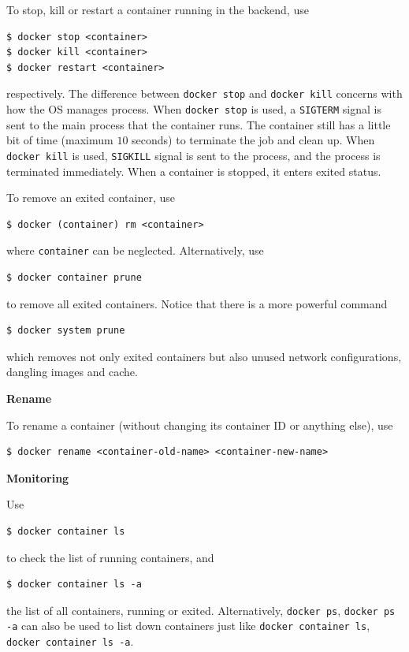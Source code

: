 To stop, kill or restart a container running in the backend, use
\begin{lstlisting}
$ docker stop <container>
$ docker kill <container>
$ docker restart <container>
\end{lstlisting}
respectively. The difference between \verb|docker stop| and \verb|docker kill| concerns with how the OS manages process. When \verb|docker stop| is used, a  \verb|SIGTERM| signal is sent to the main process that the container runs. The container still has a little bit of time (maximum $10$ seconds) to terminate the job and clean up. When \verb|docker kill| is used, \verb|SIGKILL| signal is sent to the process, and the process is terminated immediately. When a container is stopped, it enters exited status.

To remove an exited container, use
\begin{lstlisting}
$ docker (container) rm <container>
\end{lstlisting}
where \verb|container| can be neglected. Alternatively, use
\begin{lstlisting}
$ docker container prune
\end{lstlisting}
to remove all exited containers. Notice that there is a more powerful command
\begin{lstlisting}
$ docker system prune
\end{lstlisting}
which removes not only exited containers but also unused network configurations, dangling images and cache.

\vspace{0.1in}
\noindent \textbf{Rename}
\vspace{0.1in}

To rename a container (without changing its container ID or anything else), use
\begin{lstlisting}
$ docker rename <container-old-name> <container-new-name>
\end{lstlisting}

\vspace{0.1in}
\noindent \textbf{Monitoring}
\vspace{0.1in}

Use
\begin{lstlisting}
$ docker container ls
\end{lstlisting}
to check the list of running containers, and
\begin{lstlisting}
$ docker container ls -a
\end{lstlisting}
the list of all containers, running or exited. Alternatively, \verb|docker ps|, \verb|docker ps -a| can also be used to list down containers just like \verb|docker container ls|, \verb|docker container ls -a|.

